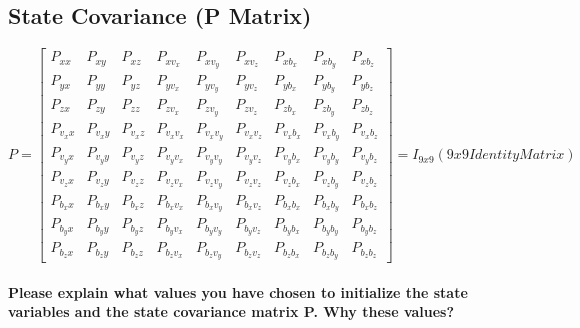 \subsection*{State Covariance (P Matrix)}

\[
P =
\begin{bmatrix}
P_{xx} & P_{xy} & P_{xz} & P_{xv_x} & P_{xv_y} & P_{xv_z} & P_{xb_x} & P_{xb_y} & P_{xb_z} \\
P_{yx} & P_{yy} & P_{yz} & P_{yv_x} & P_{yv_y} & P_{yv_z} & P_{yb_x} & P_{yb_y} & P_{yb_z} \\
P_{zx} & P_{zy} & P_{zz} & P_{zv_x} & P_{zv_y} & P_{zv_z} & P_{zb_x} & P_{zb_y} & P_{zb_z} \\
P_{v_xx} & P_{v_xy} & P_{v_xz} & P_{v_xv_x} & P_{v_xv_y} & P_{v_xv_z} & P_{v_xb_x} & P_{v_xb_y} & P_{v_xb_z} \\
P_{v_yx} & P_{v_yy} & P_{v_yz} & P_{v_yv_x} & P_{v_yv_y} & P_{v_yv_z} & P_{v_yb_x} & P_{v_yb_y} & P_{v_yb_z} \\
P_{v_zx} & P_{v_zy} & P_{v_zz} & P_{v_zv_x} & P_{v_zv_y} & P_{v_zv_z} & P_{v_zb_x} & P_{v_zb_y} & P_{v_zb_z} \\
P_{b_xx} & P_{b_xy} & P_{b_xz} & P_{b_xv_x} & P_{b_xv_y} & P_{b_xv_z} & P_{b_xb_x} & P_{b_xb_y} & P_{b_xb_z} \\
P_{b_yx} & P_{b_yy} & P_{b_yz} & P_{b_yv_x} & P_{b_yv_y} & P_{b_yv_z} & P_{b_yb_x} & P_{b_yb_y} & P_{b_yb_z} \\
P_{b_zx} & P_{b_zy} & P_{b_zz} & P_{b_zv_x} & P_{b_zv_y} & P_{b_zv_z} & P_{b_zb_x} & P_{b_zb_y} & P_{b_zb_z}
\end{bmatrix}
= I_{9x9} (9x9 Identity Matrix)
\]\\

\textbf{Please explain what values you have chosen to initialize the state variables and the state covariance matrix P. Why these values?}\\

